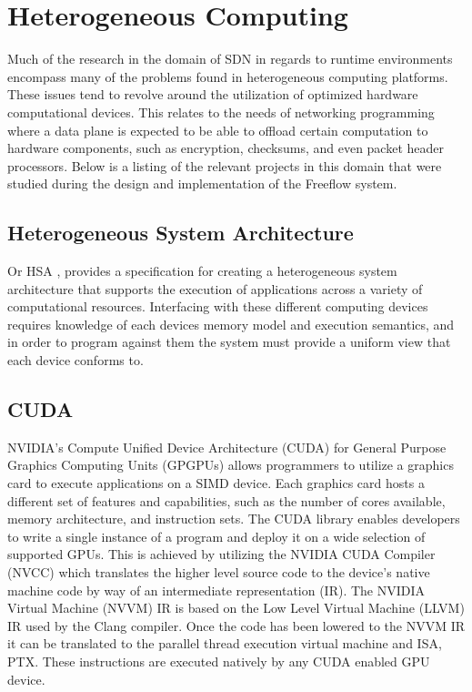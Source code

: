 \section{Heterogeneous Computing}
\label{related:hcp}
Much of the research in the domain of SDN in regards to runtime environments
encompass many of the problems found in heterogeneous computing platforms.
These issues tend to revolve around the utilization of optimized hardware
computational devices. This relates to the needs of networking programming
where a data plane is expected to be able to offload certain computation to
hardware components, such as encryption, checksums, and even packet header
processors. Below is a listing of the relevant projects in this domain that
were studied during the design and implementation of the Freeflow system.

\subsection{Heterogeneous System Architecture}
\label{related:hsa}
Or HSA \cite{hsa}, provides a specification for creating a heterogeneous
system architecture that supports the execution of applications across a
variety of computational resources. Interfacing with these different computing
devices requires knowledge of each devices memory model and execution
semantics, and in order to program against them the system must provide a
uniform view that each device conforms to.

\subsection{CUDA}
\label{related:cuda}
NVIDIA's Compute Unified Device Architecture (CUDA) \cite{cuda} for General
Purpose Graphics Computing Units (GPGPUs) allows programmers to utilize a
graphics card to execute applications on a SIMD device. Each graphics card
hosts a different set of features and capabilities, such as the number of cores
available, memory architecture, and instruction sets. The CUDA library
enables developers to write a single instance of a program and deploy
it on a wide selection of supported GPUs. This is achieved by utilizing the
NVIDIA CUDA Compiler (NVCC) which translates the higher level source code
to the device's native machine code by way of an intermediate representation
(IR). The NVIDIA Virtual Machine (NVVM) IR is based on the Low Level Virtual
Machine (LLVM) IR used by the Clang compiler. Once the code has been lowered
to the NVVM IR it can be translated to the parallel thread execution virtual
machine and ISA, PTX. These instructions are executed natively by any CUDA
enabled GPU device.

